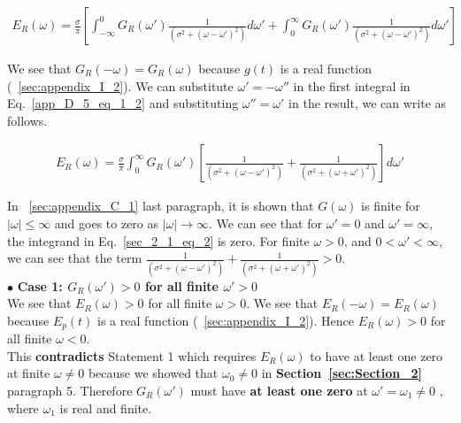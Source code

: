 \documentclass[11pt]{elsarticle}
\begin{document}
\begin{eqnarray*} \label{app_D_5_eq_1_2}   
E_{R}(\omega)  = \frac{\sigma}{ \pi}  [ \int_{-\infty}^{0} G_R(\omega') \frac{1}{(\sigma^{2} + (\omega - \omega')^{2})}  d\omega' + \int_{0}^{\infty} G_R(\omega') \frac{1}{(\sigma^{2} + (\omega - \omega')^{2})}  d\omega' ]
\end{eqnarray*} 
\begin{equation} \end{equation}


We see that $G_{R}(-\omega)= G_{R}(\omega)$ because $g(t)$ is a real function (~\ref{sec:appendix_I_2}). We can substitute $\omega' = -\omega''$ in the first integral in Eq.~\ref{app_D_5_eq_1_2} and substituting $\omega'' = \omega'$ in the result, we can write as follows.



\begin{eqnarray*} \label{app_D_5_eq_2}   
E_{R}(\omega) = \frac{\sigma}{\pi}   \int_{0}^{\infty} G_R(\omega') [  \frac{1}{(\sigma^{2} + (\omega - \omega')^{2})} + \frac{1}{(\sigma^{2} + (\omega + \omega')^{2})} ]  d\omega'  
\end{eqnarray*} 
  \begin{equation}\end{equation}

In ~\ref{sec:appendix_C_1} last paragraph, it is shown that $G(\omega)$ is finite for $|\omega| \leq \infty$ and goes to zero as $|\omega| \to \infty$. We can see that for $\omega' = 0$ and $\omega'=\infty$, the integrand in Eq.~\ref{sec_2_1_eq_2} is zero. For finite $\omega > 0$, and $0 < \omega' < \infty$, we can see that the term $ \frac{1}{(\sigma^{2} + (\omega - \omega')^{2})} + \frac{1}{(\sigma^{2} + (\omega + \omega')^{2})} > 0$. \\



$\bullet$ \textbf{\textbf{Case 1:} $G_R(\omega') > 0$ for all finite $\omega' > 0$ } \\

We see that $E_{R}(\omega) > 0$ for all finite $\omega > 0$. We see that $E_{R}(-\omega)= E_{R}(\omega)$ because $E_p(t)$ is a real function (~\ref{sec:appendix_I_2}). Hence $E_{R}(\omega) > 0$ for all finite $\omega < 0$.\\

 This \textbf{contradicts} Statement 1 which requires $E_{R}(\omega)$ to have at least one zero at finite $\omega \neq 0$ because we showed that $\omega_0 \neq 0$ in \textbf{Section~\ref{sec:Section_2}} paragraph 5. Therefore $G_{R}(\omega')$ must have\textbf{ at least one zero} at $\omega' =  \omega_1 \neq 0$ , where $\omega_{1}$ is real and finite. \\
\end{document}
